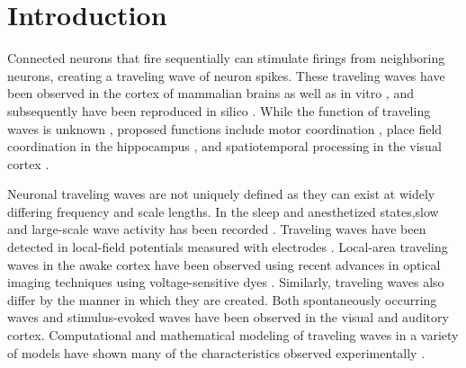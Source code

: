 \documentclass[12pt]{article}
\begin{document}

\section{Introduction} 
Connected neurons that fire sequentially can stimulate firings from neighboring neurons, creating a traveling wave of neuron spikes. 
These traveling waves have been observed in the cortex of mammalian brains \parencite{Muller2018}\parencite{reimer2010}  as well as in vitro \parencite{wu2008}\parencite{huang2004}\parencite{Golomb1999}, and subsequently have been reproduced in silico \parencite{keane2015}\parencite{Senk2020}\parencite{Golomb1996}\parencite{ermentrout2001}. 
While the function of traveling waves is unknown \parencite{wu2008}\parencite{Muller2018}, proposed functions include motor coordination \parencite{Rubino2006}  , place field coordination in the hippocampus \parencite{lubernov2009}, and spatiotemporal processing in the visual cortex \parencite{wu2008}\parencite{Muller2014}.

Neuronal traveling waves are not uniquely defined as they can exist at widely differing frequency and scale lengths.  
In the sleep and anesthetized states,slow and large-scale wave activity has been recorded \parencite{Muller2018}. 
Traveling waves have been detected in local-field potentials measured with electrodes \parencite{Rubino2006}\parencite{sanes1993}\parencite{Riehle2013}.
Local-area traveling waves in the awake cortex have been observed using recent advances in optical imaging techniques using voltage-sensitive dyes \parencite{wu2008}\parencite{Shoham1999}\parencite{Xu2007}\parencite{Ferezou2006}.  
Similarly, traveling waves also differ by the manner in which they are created. 
Both spontaneously occurring waves and stimulus-evoked \parencite{reimer2010} waves have been observed in the visual and auditory cortex. 
Computational and mathematical modeling of traveling waves in a variety of models have shown many of the characteristics observed experimentally \parencite{ermentrout2001}\parencite{keane2015}\parencite{gibson2009}.
\end{document}
